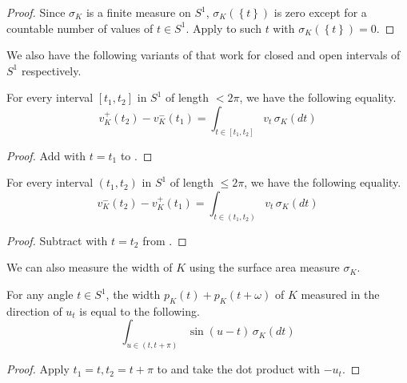 \begin{proof}
Since \(\sigma_K\) is a finite measure on \(S^1\), \(\sigma_K(\left\{ t \right\})\) is zero except for a countable number of values of \(t \in S^1\). Apply  to such \(t\) with \(\sigma_K(\left\{ t \right\}) = 0\).
\end{proof}

We also have the following variants of  that work for closed and open intervals of \(S^1\) respectively.

\begin{corollary}

For every interval \([t_1, t_2]\) in \(S^1\) of length \(< 2\pi\), we have the following equality.
\[
v_K^+(t_2) - v_K^-(t_1) = \int_{t \in [t_1, t_2]} v_t \, \sigma_K(dt)
\]

\label{cor:boundary-measure-closed}
\end{corollary}

\begin{proof}
Add  with \(t=t_1\) to .
\end{proof}

\begin{corollary}

For every interval \((t_1, t_2)\) in \(S^1\) of length \(\leq 2\pi\), we have the following equality.
\[
v_K^-(t_2) - v_K^+(t_1) = \int_{t \in (t_1, t_2)} v_t \, \sigma_K(dt)
\]

\label{cor:boundary-measure-open}
\end{corollary}

\begin{proof}
Subtract  with \(t=t_2\) from .
\end{proof}

We can also measure the width of \(K\) using the surface area measure \(\sigma_K\).

\begin{corollary}

For any angle \(t \in S^1\), the width \(p_K(t) + p_K(t + \omega)\) of \(K\) measured in the direction of \(u_t\) is equal to the following.
\[
\int_{u \in (t, t + \pi)} \sin(u - t) \, \sigma_K(dt)
\]

\label{cor:boundary-measure-width}
\end{corollary}

\begin{proof}
Apply \(t_1 = t, t_2 = t + \pi\) to  and take the dot product with \(-u_t\).
\end{proof}